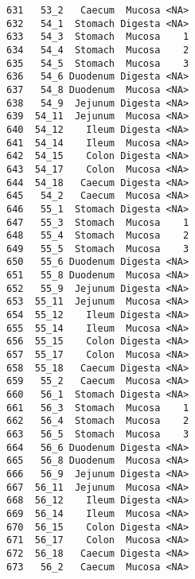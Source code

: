 \documentclass[
  letterpaper,
  DIV=11,
  numbers=noendperiod]{scrartcl}
\begin{document}
\begin{verbatim}
631   53_2   Caecum  Mucosa <NA>
632   54_1  Stomach Digesta <NA>
633   54_3  Stomach  Mucosa    1
634   54_4  Stomach  Mucosa    2
635   54_5  Stomach  Mucosa    3
636   54_6 Duodenum Digesta <NA>
637   54_8 Duodenum  Mucosa <NA>
638   54_9  Jejunum Digesta <NA>
639  54_11  Jejunum  Mucosa <NA>
640  54_12    Ileum Digesta <NA>
641  54_14    Ileum  Mucosa <NA>
642  54_15    Colon Digesta <NA>
643  54_17    Colon  Mucosa <NA>
644  54_18   Caecum Digesta <NA>
645   54_2   Caecum  Mucosa <NA>
646   55_1  Stomach Digesta <NA>
647   55_3  Stomach  Mucosa    1
648   55_4  Stomach  Mucosa    2
649   55_5  Stomach  Mucosa    3
650   55_6 Duodenum Digesta <NA>
651   55_8 Duodenum  Mucosa <NA>
652   55_9  Jejunum Digesta <NA>
653  55_11  Jejunum  Mucosa <NA>
654  55_12    Ileum Digesta <NA>
655  55_14    Ileum  Mucosa <NA>
656  55_15    Colon Digesta <NA>
657  55_17    Colon  Mucosa <NA>
658  55_18   Caecum Digesta <NA>
659   55_2   Caecum  Mucosa <NA>
660   56_1  Stomach Digesta <NA>
661   56_3  Stomach  Mucosa    1
662   56_4  Stomach  Mucosa    2
663   56_5  Stomach  Mucosa    3
664   56_6 Duodenum Digesta <NA>
665   56_8 Duodenum  Mucosa <NA>
666   56_9  Jejunum Digesta <NA>
667  56_11  Jejunum  Mucosa <NA>
668  56_12    Ileum Digesta <NA>
669  56_14    Ileum  Mucosa <NA>
670  56_15    Colon Digesta <NA>
671  56_17    Colon  Mucosa <NA>
672  56_18   Caecum Digesta <NA>
673   56_2   Caecum  Mucosa <NA>
\end{verbatim}
\end{document}
